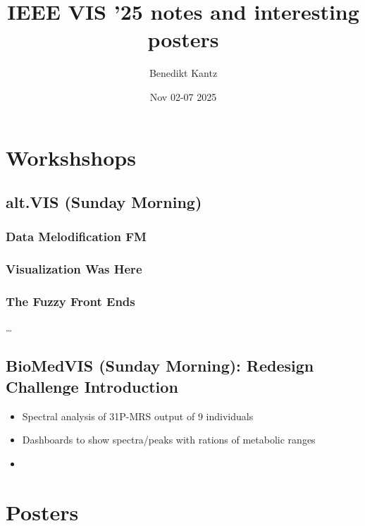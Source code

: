 \documentclass[a4paper]{article}
\title{IEEE VIS '25 notes and interesting posters}
\author{Benedikt Kantz}
\date{Nov 02-07 2025}
\begin{document}
\maketitle
\tableofcontents
\section{Workshshops}
\subsection{alt.VIS (Sunday Morning)}
\subsubsection{Data Melodification FM}
\subsubsection{Visualization Was Here}
\subsubsection{The Fuzzy Front Ends}
\ldots
\subsection{BioMedVIS (Sunday Morning): Redesign Challenge Introduction}
\begin{itemize}
    \item Spectral analysis of 31P-MRS output of 9 individuals
    \item Dashboards to show spectra/peaks with rations of metabolic ranges
    \item  
\end{itemize}


\section{Posters}
 

\printbibliography
\end{document}
